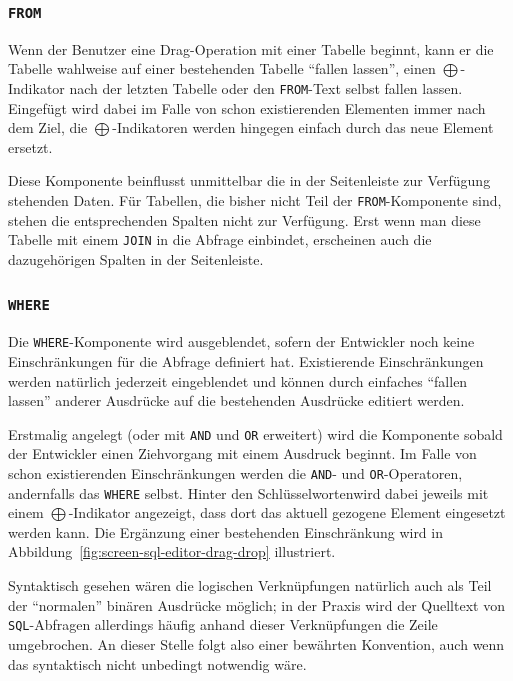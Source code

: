 \subsubsection{\texttt{FROM}}

Wenn der Benutzer eine Drag-Operation mit einer Tabelle beginnt, kann er die Tabelle wahlweise auf einer bestehenden Tabelle "`fallen lassen"', einen $\bigoplus$-Indikator nach der letzten Tabelle oder den \texttt{FROM}-Text selbst fallen lassen. Eingefügt wird dabei im Falle von schon existierenden Elementen immer nach dem Ziel, die $\bigoplus$-Indikatoren werden hingegen einfach durch das neue Element ersetzt.

Diese Komponente beinflusst unmittelbar die in der Seitenleiste zur Verfügung stehenden Daten. Für Tabellen, die bisher nicht Teil der \texttt{FROM}-Komponente sind, stehen die entsprechenden Spalten nicht zur Verfügung. Erst wenn man diese Tabelle mit einem \texttt{JOIN} in die Abfrage einbindet, erscheinen auch die dazugehörigen Spalten in der Seitenleiste.

\subsubsection{\texttt{WHERE}}

Die \texttt{WHERE}-Komponente wird ausgeblendet, sofern der Entwickler noch keine Einschränkungen für die Abfrage definiert hat. Existierende Einschränkungen werden natürlich jederzeit eingeblendet und können durch einfaches "`fallen lassen"' anderer Ausdrücke auf die bestehenden Ausdrücke editiert werden.

Erstmalig angelegt (oder mit \texttt{AND} und \texttt{OR} erweitert) wird die Komponente sobald der Entwickler einen Ziehvorgang mit einem Ausdruck beginnt. Im Falle von schon existierenden Einschränkungen werden die \texttt{AND}- und \texttt{OR}-Operatoren, andernfalls das \texttt{WHERE} selbst. Hinter den Schlüsselwortenwird dabei jeweils mit einem $\bigoplus$-Indikator angezeigt, dass dort das aktuell gezogene Element eingesetzt werden kann. Die Ergänzung einer bestehenden Einschränkung wird in Abbildung~\ref{fig:screen-sql-editor-drag-drop} illustriert.

Syntaktisch gesehen wären die logischen Verknüpfungen natürlich auch als Teil der "`normalen"' binären Ausdrücke möglich; in der Praxis wird der Quelltext von \texttt{SQL}-Abfragen allerdings häufig anhand dieser Verknüpfungen die Zeile umgebrochen. An dieser Stelle folgt \idename{} also einer bewährten Konvention, auch wenn das syntaktisch nicht unbedingt notwendig wäre.

